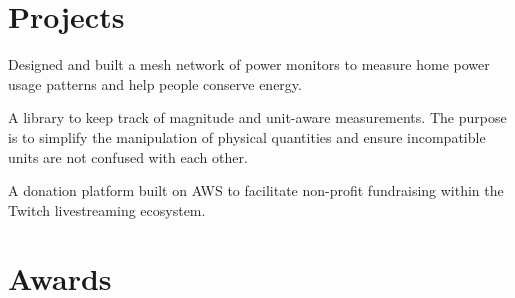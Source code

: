 \documentclass[letterpaper]{deedy-resume} %
\begin{document}
\begin{minipage}[t]{0.99\textwidth} %


\section{Projects}


Designed and built a mesh network of power monitors to measure home power usage patterns and help people conserve energy.

\sectionspace %



A library to keep track of magnitude and unit-aware measurements.
The purpose is to simplify the manipulation of physical quantities and ensure incompatible units are not confused with each other.

\sectionspace %



A donation platform built on AWS to facilitate non-profit fundraising within the Twitch livestreaming ecosystem.

\sectionspace %


\section{Awards} 


\end{minipage}
\end{document}
